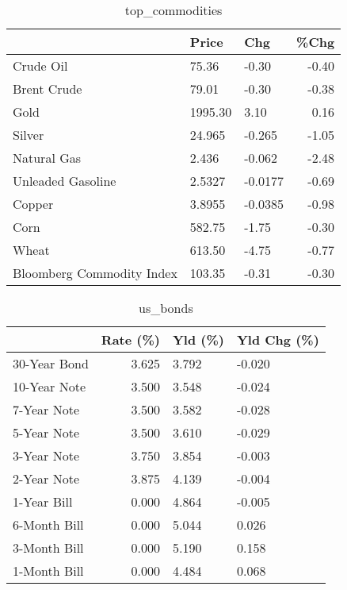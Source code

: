 \documentclass{article}%
\begin{document}
\begin{table}[htbp]%
\caption{top\_commodities}%
\centering%
\begin{adjustbox}{width=1\textwidth}%
\begin{tabular}{lllr}
\toprule
                          &   Price &     Chg &  \%Chg \\
\midrule
               Crude Oil  &   75.36 &   -0.30 & -0.40 \\
             Brent Crude  &   79.01 &   -0.30 & -0.38 \\
                    Gold  & 1995.30 &    3.10 &  0.16 \\
                  Silver  &  24.965 &  -0.265 & -1.05 \\
             Natural Gas  &   2.436 &  -0.062 & -2.48 \\
       Unleaded Gasoline  &  2.5327 & -0.0177 & -0.69 \\
                  Copper  &  3.8955 & -0.0385 & -0.98 \\
                    Corn  &  582.75 &   -1.75 & -0.30 \\
                   Wheat  &  613.50 &   -4.75 & -0.77 \\
Bloomberg Commodity Index &  103.35 &   -0.31 & -0.30 \\
\bottomrule
\end{tabular}
%
\end{adjustbox}%
\end{table}

%


\begin{table}[htbp]%
\caption{us\_bonds}%
\centering%
\begin{adjustbox}{width=1\textwidth}%
\begin{tabular}{lrll}
\toprule
             &  Rate (\%) & Yld (\%) & Yld Chg (\%) \\
\midrule
30-Year Bond &     3.625 &   3.792 &      -0.020 \\
10-Year Note &     3.500 &   3.548 &      -0.024 \\
 7-Year Note &     3.500 &   3.582 &      -0.028 \\
 5-Year Note &     3.500 &   3.610 &      -0.029 \\
 3-Year Note &     3.750 &   3.854 &      -0.003 \\
 2-Year Note &     3.875 &   4.139 &      -0.004 \\
 1-Year Bill &     0.000 &   4.864 &      -0.005 \\
6-Month Bill &     0.000 &   5.044 &       0.026 \\
3-Month Bill &     0.000 &   5.190 &       0.158 \\
1-Month Bill &     0.000 &   4.484 &       0.068 \\
\bottomrule
\end{tabular}
%
\end{adjustbox}%
\end{table}
\end{document}
